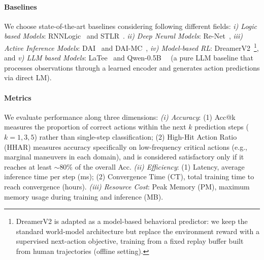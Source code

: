 \documentclass{article} %
\newcommand{\revise}[1]{#1}
\begin{document}
\paragraph{Baselines} We choose state-of-the-art baselines considering following different fields: {\it i) Logic based Models}: RNNLogic~\citep{qu2020rnnlogic} and STLR~\citep{cao2023discovering}. {\it ii) Deep Neural Models}: Re-Net~\citep{jin2019recurrent}, {\it iii) Active Inference Models}: DAI~\citep{ccatal2020learning} and DAI-MC~\citep{fountas2020deep}, {\it iv) Model-based RL}: DreamerV2~\citep{hafner2020mastering}\revise{\footnote{DreamerV2 is adapted as a model-based behavioral predictor: we keep the standard world-model architecture but replace the environment reward with a supervised next-action objective, training from a fixed replay buffer built from human trajectories (offline setting).}}, and {\it v) LLM based Models}: LaTee~\citep{song2024latent} and \revise{Qwen-0.5B~\citep{qwen2.5}~\cite{qwen2} (a pure LLM baseline that processes observations through a learned encoder and generates action predictions via direct LM)}.

\paragraph{Metrics} 
We evaluate performance along three dimensions:  
{\it (i) Accuracy}: (1) Acc@k measures the proportion of correct actions within the next $k$ prediction steps 
($k{=}1,3,5$) rather than single-step classification; 
(2) High-Hit Action Ratio (HHAR) measures accuracy specifically on low-frequency critical actions 
(e.g., marginal maneuvers in each domain), and is considered satisfactory only if it reaches at least 
$\sim$80\% of the overall Acc.  
{\it (ii) Efficiency}: (1) Latency, average inference time per step (ms); 
(2) Convergence Time (CT), total training time to reach convergence (hours).  
{\it (iii) Resource Cost}: Peak Memory (PM), maximum memory usage during training and inference (MB).
\end{document}
